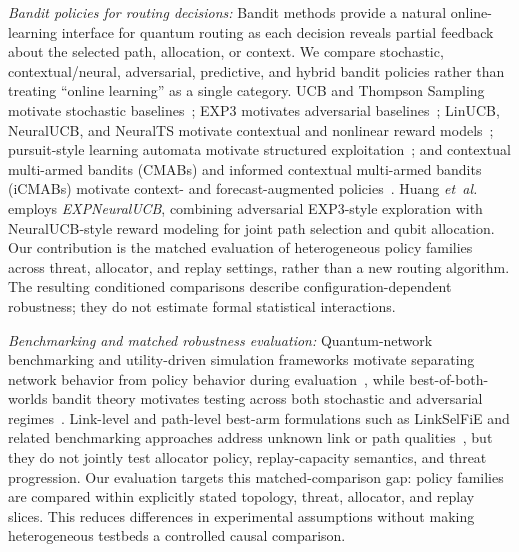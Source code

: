 \documentclass[10pt,journal]{IEEEtran}
\newcommand{\etal}{\emph{et~al.}\xspace}
\newcommand{\smallTitle}[1]{\vspace{1mm}\noindent\textit{#1:}}
\newcommand{\dan}[1]{\textcolor{blue}{\textit{[Dan: #1]}}}
\begin{document}
\smallTitle{Bandit policies for routing decisions}
Bandit methods provide a natural online-learning interface for quantum routing as each decision reveals partial feedback about the selected path, allocation, or context. We compare stochastic, contextual/neural, adversarial, predictive, and hybrid bandit policies rather than treating ``online learning'' as a single category. UCB and Thompson Sampling motivate stochastic baselines~\cite{auer2002finite,thompson1933likelihood}; EXP3 motivates adversarial baselines~\cite{auer2002nonstochastic}; LinUCB, NeuralUCB, and NeuralTS motivate contextual and nonlinear reward models~\cite{li2010contextual,chu2011contextual,zhou2020neuralucb,zhang2022neuralts}; pursuit-style learning automata motivate structured exploitation~\cite{thathachar2011networks}; and contextual multi-armed bandits (CMABs) and informed contextual multi-armed bandits (iCMABs) motivate context- and forecast-augmented policies~\cite{kar2024icmab,box2015time}. Huang \etal~\cite{huang2024quantum} employs \emph{EXPNeuralUCB}, combining adversarial EXP3-style exploration with NeuralUCB-style reward modeling for joint path selection and qubit allocation. Our contribution is the matched evaluation of heterogeneous policy families across threat, allocator, and replay settings, rather than a new routing algorithm. The resulting conditioned comparisons describe configuration-dependent robustness; they do not estimate formal statistical interactions.

\smallTitle{Benchmarking and matched robustness evaluation}
Quantum-network benchmarking and utility-driven simulation frameworks motivate separating network behavior from policy behavior during evaluation~\cite{coopmans2021benchmark,kozlowski2022utility}, while best-of-both-worlds bandit theory motivates testing across both stochastic and adversarial regimes~\cite{zimmert2019optimal}. Link-level and path-level best-arm formulations such as LinkSelFiE and related benchmarking approaches address unknown link or path qualities~\cite{10621263,wang2025learning}, but they do not jointly test allocator policy, replay-capacity semantics, and threat progression. Our evaluation targets this matched-comparison gap: policy families are compared within explicitly stated topology, threat, allocator, and replay slices. This reduces differences in experimental assumptions without making heterogeneous testbeds a controlled causal comparison.
\end{document}

